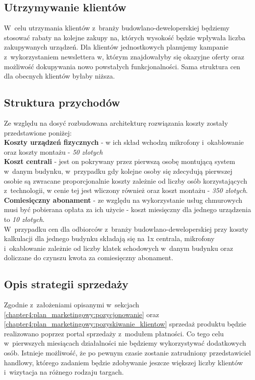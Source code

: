 \documentclass[../main.tex]{subfiles}
\begin{document}
{    \subsection{Utrzymywanie klientów}
    \label{chapter4:plan_marketingowy:utrzymywanie_klientow} {
        W~celu utrzymania klientów z~branży budowlano-deweloperskiej będziemy stosować
        rabaty na kolejne zakupy na, których wysokość będzie wpływała liczba
        zakupywanych urządzeń. Dla klientów jednostkowych planujemy kampanie
        z~wykorzystaniem newslettera w, którym znajdowałyby się okazyjne oferty oraz
        możliwość dokupywania nowo powstałych funkcjonalności. Sama struktura cen dla
        obecnych klientów byłaby niższa.
    }

    \subsection{Struktura przychodów}
    \label{chapter4:plan_marketingowy:strukutura_przychodow} {
        Ze względu na dosyć rozbudowana architekturę rozwiązania koszty zostały
        przedstawione poniżej:\\
        \noindent\textbf{Koszty urządzeń fizycznych} - w ich skład wchodzą mikrofony
        i~okablowanie oraz koszty montażu - \textit{50 złotych}\\

        \noindent\textbf{Koszt centrali} - jest on pokrywany przez pierwszą osobę
        montującą system w~danym budynku, w~przypadku gdy kolejne osoby się zdecydują
        pierwszej osobie są zwracane proporcjonalnie koszty zależnie od liczby osób
        korzystających z~technologii, w cenie tej jest wliczony również oraz koszt
        montażu - \textit{350 złotych}.\\

        \noindent\textbf{Comiesięczny abonament} - ze względu na wykorzystanie usług
        chmurowych musi być pobierana opłata za ich użycie - koszt miesięczny dla
        jednego urządzenia to \textit{10 złotych}.\\

        W~przypadku cen dla odbiorców z~branży budowlano-deweloperskiej przy koszty
        kalkulacji dla jednego budynku składają się na 1x centrala, mikrofony
        i~okablowanie zależnie od liczby klatek schodowych w~danym budynku oraz
        doliczane do czynszu kwota za comiesięczny abonament.
    }

    \subsection{Opis strategii sprzedaży}
    \label{chapter4:plan_marketingowy:strategia_sprzedazy} {
        Zgodnie z~założeniami opisanymi w~sekcjach
        \ref{chapter4:plan_marketingowy:pozycjonowanie} oraz
        \ref{chapter4:plan_marketingowy:pozyskiwanie_klientow} sprzedaż produktu będzie
        realizowano poprzez portal sprzedaży z~modułem płatności. Co tego celu
        w~pierwszych miesiącach działalności nie będziemy wykorzystywać dodatkowych osób.
        Istnieje możliwość, że po pewnym czasie zostanie zatrudniony przedstawiciel
        handlowy, którego zadaniem będzie zdobywanie jeszcze większej liczby klientów
        i~wizytacja na różnego rodzaju targach.
    }
}
\end{document}
